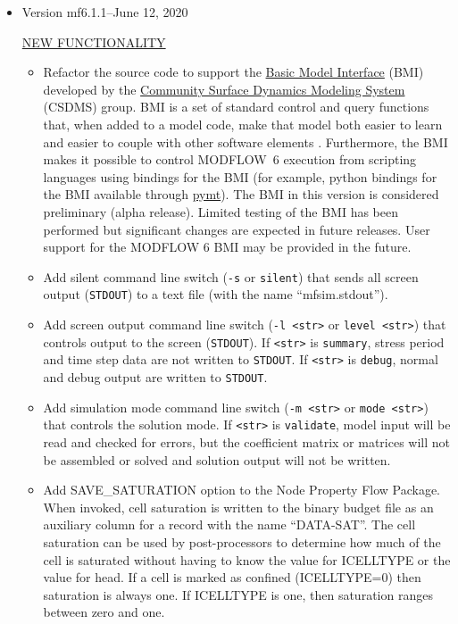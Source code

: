 \begin{itemize}
        

	\item Version mf6.1.1--June 12, 2020

	\underline{NEW FUNCTIONALITY}
	\begin{itemize}
		\item Refactor the source code to support the \href{https://csdms.colorado.edu/wiki/BMI_Description}{Basic Model Interface} (BMI) developed by the \href{https://csdms.colorado.edu/wiki/Main_Page}{Community Surface Dynamics Modeling System} (CSDMS) group. BMI is a set of standard control and query functions that, when added to a model code, make that model both easier to learn and easier to couple with other software elements \citep{PECKHAM20133}. Furthermore, the BMI makes it possible to control MODFLOW~6 execution from scripting languages using bindings for the BMI (for example, python bindings for the BMI available through \href{https://csdms.colorado.edu/wiki/PyMT}{pymt}). The BMI in this version is considered preliminary (alpha release). Limited testing of the BMI has been performed but significant changes are expected in future releases.  User support for the MODFLOW 6 BMI may be provided in the future.
		\item Add silent command line switch (\texttt{-s} or \texttt{\doubledash silent}) that sends all screen output (\texttt{STDOUT}) to a text file (with the name ``mfsim.stdout'').
		\item Add screen output command line switch (\texttt{-l <str>} or \texttt{\doubledash level <str>}) that controls output to the screen (\texttt{STDOUT}). If \texttt{<str>}  is \texttt{summary}, stress period and time step data are not written to \texttt{STDOUT}. If \texttt{<str>} is \texttt{debug}, normal and debug output are written to \texttt{STDOUT}. 
		\item Add simulation mode command line switch (\texttt{-m <str>} or \texttt{\doubledash mode <str>}) that controls the solution mode. If \texttt{<str>}  is \texttt{validate}, model input will be read and checked for errors, but the coefficient matrix or matrices will not be assembled or solved and solution output will not be written.
		\item Add SAVE\_SATURATION option to the Node Property Flow Package.  When invoked, cell saturation is written to the binary budget file as an auxiliary column for a record with the name ``DATA-SAT''.  The cell saturation can be used by post-processors to determine how much of the cell is saturated without having to know the value for ICELLTYPE or the value for head. If a cell is marked as confined (ICELLTYPE=0) then saturation is always one. If ICELLTYPE is one, then saturation ranges between zero and one.

\end{itemize}
\end{itemize}
